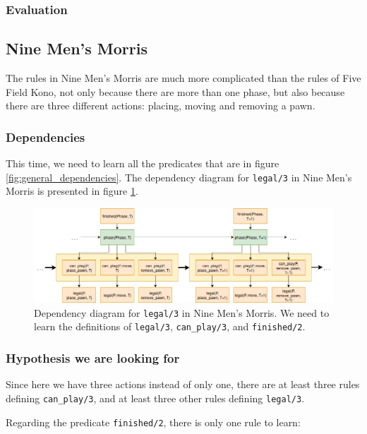 \subsubsection{Evaluation}

\subsection{Nine Men's Morris}

The rules in Nine Men's Morris are much more complicated than the rules of Five Field Kono, not only because there are more than one phase, but also because there are three different actions: placing, moving and removing a pawn.

\subsubsection{Dependencies}

This time, we need to learn all the predicates that are in figure \ref{fig:general_dependencies}. The dependency diagram for \texttt{legal/3} in Nine Men's Morris is presented in figure \ref{fig:9MM_dependencies}.

\begin{figure}[h]
\centering
\includegraphics[width = 1\hsize]{figures/9MM_dependancies.png}
\caption{Dependency diagram for \texttt{legal/3} in Nine Men's Morris. We need to learn the definitions of \texttt{legal/3}, \texttt{can\_play/3}, and \texttt{finished/2}.}
\label{fig:9MM_dependencies}
\end{figure}

\subsubsection{Hypothesis we are looking for}

Since here we have three actions instead of only one, there are at least three rules defining \texttt{can\_play/3}, and at least three other rules defining \texttt{legal/3}.

\bigskip

Regarding the predicate \texttt{finished/2}, there is only one rule to learn:\\

